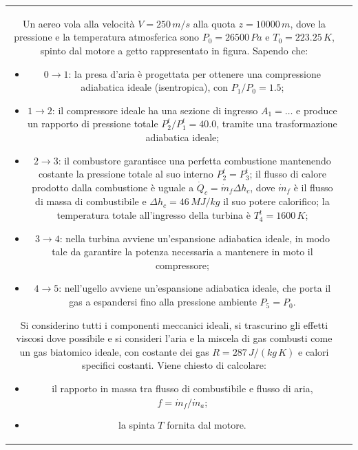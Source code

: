 \noindent
\begin{tabular}{cc}
\begin{minipage}{0.95\textwidth}
\begin{exerciseS}
 Un aereo vola alla velocità $V=250 \, m/s$ alla quota $z=10000 \, m$, dove la pressione e la temperatura atmosferica sono $P_0 = 26500 \, Pa$ e $T_0 = 223.25 \, K$, spinto dal motore a getto rappresentato in figura. Sapendo che:
 \begin{itemize}
  \item $0 \rightarrow 1$: la presa d'aria è progettata per ottenere una compressione adiabatica ideale (isentropica), con $P_1/P_0 = 1.5$;
  \item $1 \rightarrow 2$: il compressore ideale ha una sezione di ingresso $A_1 = \dots$ e produce un rapporto di pressione totale $P_2^t/P_1^t = 40.0$, tramite una trasformazione adiabatica ideale;
  \item $2 \rightarrow 3$: il combustore garantisce una perfetta combustione mantenendo costante la pressione totale al suo interno $P_2^t = P_3^t$; il flusso di calore prodotto dalla combustione è uguale a $\dot{Q}_c = \dot{m}_f \Delta h_c$, dove $\dot{m}_f$ è il flusso di massa di combustibile e $\Delta h_c = 46 \, MJ/kg$ il suo potere calorifico; la temperatura totale all'ingresso della turbina è $T_4^t = 1600 \, K$;
  \item $3 \rightarrow 4$: nella turbina avviene un'espansione adiabatica ideale, in modo tale da garantire la potenza necessaria a mantenere in moto il compressore;
  \item $4 \rightarrow 5$: nell'ugello avviene un'espansione adiabatica ideale, che porta il gas a espandersi fino alla pressione ambiente $P_5 = P_0$.
 \end{itemize}
 Si considerino tutti i componenti meccanici ideali, si trascurino gli effetti viscosi dove possibile e si consideri l'aria e la miscela di gas combusti come un gas biatomico ideale, con costante dei gas $R = 287 \, J/(kg \, K)$ e calori specifici costanti.
 \newline \noindent
Viene chiesto di calcolare:
\begin{itemize}
 \item il rapporto in massa tra flusso di combustibile e flusso di aria, $f = \dot{m}_f / \dot{m}_a$;
 \item la spinta $T$ fornita dal motore.
\end{itemize}
\end{exerciseS}
\end{minipage}
\end{tabular}
